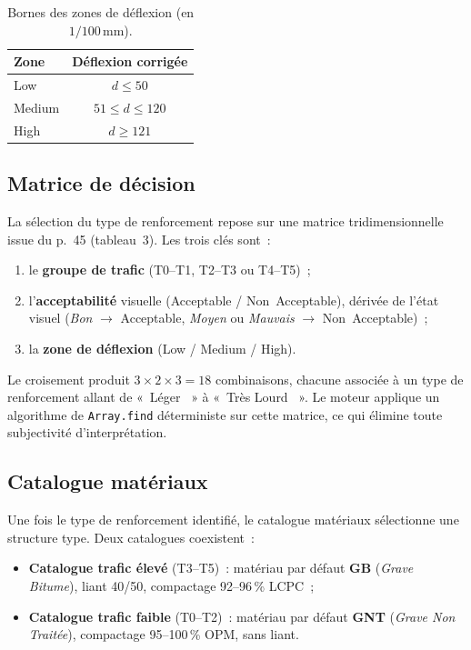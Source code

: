 \begin{table}[H]
\centering
\caption{Bornes des zones de déflexion (en $1/100$\,mm).}
\label{tab:zones}
\begin{tabular}{@{}lc@{}}
\toprule
\bfseries Zone & \bfseries Déflexion corrigée \\
\midrule
Low    & $d \leq 50$ \\
Medium & $51 \leq d \leq 120$ \\
High   & $d \geq 121$ \\
\bottomrule
\end{tabular}
\end{table}

\subsection{Matrice de décision}
\label{sec:matrice}

La sélection du type de renforcement repose sur une matrice
tridimensionnelle issue du \cttp{} p.~45 (tableau~3). Les trois clés
sont~:

\begin{enumerate}
  \item le \textbf{groupe de trafic} (T0--T1, T2--T3 ou T4--T5)~;
  \item l'\textbf{acceptabilité} visuelle (Acceptable /
        Non~Acceptable), dérivée de l'état visuel
        (\textit{Bon} $\to$ Acceptable, \textit{Moyen} ou
        \textit{Mauvais} $\to$ Non~Acceptable)~;
  \item la \textbf{zone de déflexion} (Low / Medium / High).
\end{enumerate}

Le croisement produit $3 \times 2 \times 3 = 18$ combinaisons,
chacune associée à un type de renforcement allant de «~Léger~ » à
«~Très Lourd~ ». Le moteur applique un algorithme de
\texttt{Array.find} déterministe sur cette matrice, ce qui élimine
toute subjectivité d'interprétation.

\subsection{Catalogue matériaux}
\label{sec:catalogue}

Une fois le type de renforcement identifié, le catalogue matériaux
sélectionne une structure type. Deux catalogues coexistent~:

\begin{itemize}
  \item \textbf{Catalogue trafic élevé} (T3--T5)~: matériau par défaut
        \textbf{GB} (\textit{Grave Bitume}), liant 40/50, compactage
        92--96\,\% LCPC~;
  \item \textbf{Catalogue trafic faible} (T0--T2)~: matériau par
        défaut \textbf{GNT} (\textit{Grave Non Traitée}), compactage
        95--100\,\% OPM, sans liant.
\end{itemize}

